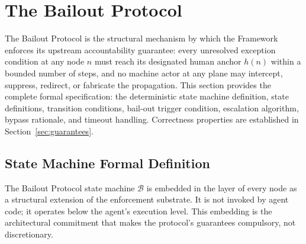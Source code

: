 \section{The Bailout Protocol}
\label{sec:bailout-protocol}

The Bailout Protocol is the structural mechanism by which the \bxthree{} Framework enforces its upstream accountability guarantee: every unresolved exception condition at any node $n$ must reach its designated human anchor $h(n)$ within a bounded number of steps, and no machine actor at any plane may intercept, suppress, redirect, or fabricate the propagation. This section provides the complete formal specification: the deterministic state machine definition, state definitions, transition conditions, bail-out trigger condition, escalation algorithm, bypass rationale, and timeout handling. Correctness properties are established in Section~\ref{sec:guarantees}.

\subsection{State Machine Formal Definition}
\label{sec:bp-state-machine}

The Bailout Protocol state machine $\mathcal{B}$ is embedded in the \fact{} layer of every \bxthree{} node as a structural extension of the enforcement substrate. It is not invoked by agent code; it operates below the agent's execution level. This embedding is the architectural commitment that makes the protocol's guarantees compulsory, not discretionary.

